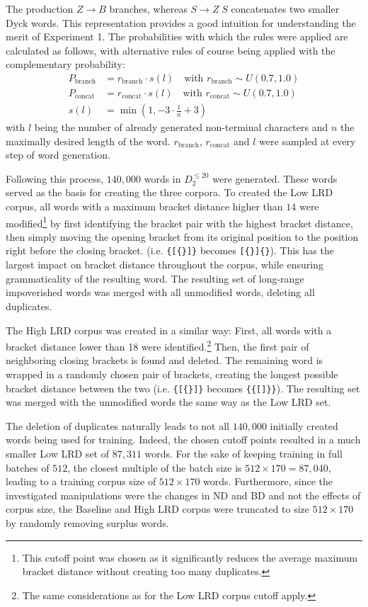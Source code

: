The production $Z \rightarrow B$ branches, whereas $S \rightarrow Z \; S$ concatenates two smaller Dyck words. This representation provides a good intuition for understanding the merit of Experiment 1. The probabilities with which the rules were applied are calculated as follows, with alternative rules of course being applied with the complementary probability:
\begin{align*}
	P_{\text{branch}} &= r_{\text{branch}} \cdot s(l) \quad \text{with } r_{\text{branch}} \sim U(0.7,1.0) \\
	P_{\text{concat}} &= r_{\text{concat}} \cdot s(l) \quad \text{with } r_{\text{concat}} \sim U(0.7,1.0) \\
	s(l) &= \min(1, -3 \cdot \frac{l}{n} + 3)
\end{align*}
with $l$ being the number of already generated non-terminal characters and $n$ the maximally desired length of the word. $r_{\text{branch}}$, $r_{\text{concat}}$ and $l$ were sampled at every step of word generation.

Following this process, $140,000$ words in $D_{2}^{\leq 20}$ were generated. These words served as the basis for creating the three corpora. To created the Low LRD corpus, all words with a maximum bracket distance higher than $14$ were modified\footnote{This cutoff point was chosen as it significantly reduces the average maximum bracket distance without creating too many duplicates.} by first identifying the bracket pair with the highest bracket distance, then simply moving the opening bracket from its original position to the position right before the closing bracket. (i.e. \texttt{\{[\{\}]\}} becomes \texttt{[\{\}]\{\}}). This has the largest impact on bracket distance throughout the corpus, while ensuring grammaticality of the resulting word. The resulting set of long-range impoverished words was merged with all unmodified words, deleting all duplicates.

The High LRD corpus was created in a similar way: First, all words with a bracket distance lower than 18 were identified.\footnote{The same considerations as for the Low LRD corpus cutoff apply.} Then, the first pair of neighboring closing brackets is found and deleted. The remaining word is wrapped in a randomly chosen pair of brackets, creating the longest possible bracket distance between the two (i.e. \texttt{\{[\{\}]\}} becomes \texttt{\{\{[]\}\}}). The resulting set was merged with the unmodified words the same way as the Low LRD set.

The deletion of duplicates naturally leads to not all $140,000$ initially created words being used for training. Indeed, the chosen cutoff points resulted in a much smaller Low LRD set of $87,311$ words. For the sake of keeping training in full batches of $512$, the closest multiple of the batch size is $512 \times 170 = 87,040$, leading to a training corpus size of $512 \times 170$ words. Furthermore, since the investigated manipulations were the changes in ND and BD and not the effects of corpus size, the Baseline and High LRD corpus were truncated to size $512 \times 170$ by randomly removing surplus words.

